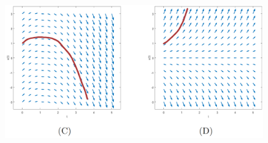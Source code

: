\documentclass[german]{uebung}
\begin{document}
\begin{exercise}{5}
\begin{enumerate}[label=(\alph*)]
\begin{figure}[h]
				\includegraphics[width=0.9\linewidth]{Capture2x.png}
			\end{figure}
	\end{enumerate}
\end{exercise}
\end{document}
